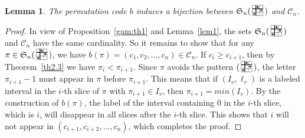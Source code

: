 \documentclass[12pt]{amsart}
\newcounter{mycount}
\theoremstyle{plain}
\newtheorem{lemma}[mycount]{Lemma}
\theoremstyle{definition}
\theoremstyle{example}
\theoremstyle{remark}
\numberwithin{equation}{section}
\numberwithin{figure}{section}
\def\S{\mathfrak{S}}
\newcommand{\PATTERN}{
    \draw[step=1, xshift=14pt, yshift=14pt, \cfill, line cap=round] (0,0) grid (3,3);
    \draw[step=1, xshift=14pt, yshift=14pt, thick] (0,2) -- (3,2);
    \draw[step=1, xshift=14pt, yshift=14pt, thick] (1,0) -- (1,3);
    \foreach \x/\y in {1/1,2/3,3/2} \node[disc, fill=black] at (\x,\y) {};
}
\newcommand{\pattern}{\!\raisebox{-0.3em}{
  \begin{tikzpicture}[line width=0.7pt, scale=0.15]
    \tikzstyle{disc} = [circle,thin,draw=black, minimum size=1.7pt, inner sep=0pt ]
    \PATTERN
  \end{tikzpicture}}
}
\newcommand{\cfill}{black!40}
\begin{document}
\begin{lemma}\label{thchi3}
The permutation code $b$ induces a bijection between  $\S_n(\pattern\,)$ and $\mathcal{C}_n$. 



\end{lemma}
\begin{proof}
In view of Proposition~\ref{gam:th1} and Lemma~\ref{lem1}, the sets  $\S_n(\pattern\,)$ and $\mathcal{C}_n$ have the same cardinality. So it remains to show that  for any $\pi\in \S_n(\pattern\,)$, we have $b(\pi)=(c_1,c_2,\ldots, c_n)\in \mathcal{C}_n$. If $c_i\geq c_{i+1}$, then by Theorem~\ref{th2.3} we have $\pi_i<\pi_{i+1}$. Since $\pi$ avoids the pattern $(\pattern\,)$, the letter $\pi_{i+1}-1$ must appear in $\pi$ before $\pi_{i+1}$. This means that if $(I_v,\ell_v)$ is a labeled interval in the $i$-th slice of $\pi$ with $\pi_{i+1}\in I_v $, then  $\pi_{i+1}=min(I_v)$. By the construction of $b(\pi)$, the label of the interval containing  $0$ in the $i$-th slice, which is $i$, will disappear in  all slices after the $i$-th slice. This shows that $i$ will not appear in $(c_{i+1},c_{i+2},\ldots, c_{n})$, which completes the proof.
\end{proof}
\end{document}
